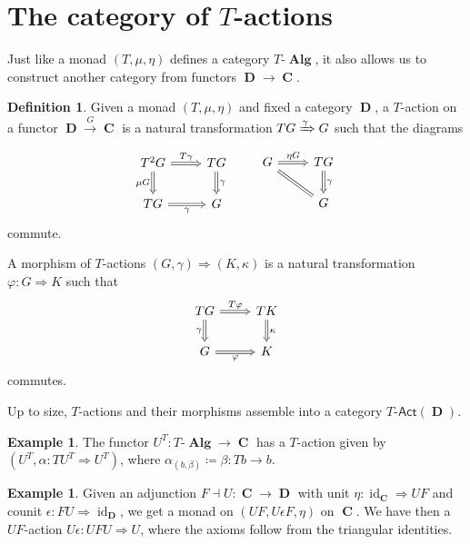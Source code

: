 \documentclass[a4paper,11pt,twoside, openany]{book}
\DeclareMathOperator{\Alg}{\mathbf{Alg}}
\DeclareMathOperator{\C}{\mathbf{C}}
\DeclareMathOperator{\D}{\mathbf{D}}
\DeclareMathOperator{\id}{id}
\theoremstyle{definition}
\theoremstyle{definition}
\newtheorem{defn}[thm]{Definition} %
\newtheorem{exmp}[thm]{Example} %
\theoremstyle{remark}
\begin{document}
\section{The category of $T$-actions}

Just like a monad $(T,\mu,\eta)$ defines a category $T\mbox{-}\Alg$, it also allows us to construct another category from functors $\D\rightarrow\C$.

\begin{defn}
	Given a monad $(T,\mu,\eta)$ and fixed a category $\D$, a $T$-action on a functor $\D\xrightarrow{G}\C$ is a natural transformation $TG\xRightarrow{\gamma}G$ such that the diagrams
	\[
		\begin{tikzcd}
			T^2G\ar["\mu G"', Rightarrow]{d}\ar["T\gamma", 	Rightarrow]{r}
			& TG\ar["\gamma", Rightarrow]{d} \\
			TG\ar["\gamma"', Rightarrow]{r}
			& G
		\end{tikzcd}
		\quad\quad
		\begin{tikzcd}
			G\ar["\eta G", Rightarrow]{r}\ar[equal]{dr}
			& TG\ar["\gamma", Rightarrow]{d}\\
			& G
		\end{tikzcd}
	\]
		commute.
	
		A morphism of $T$-actions $(G,\gamma)\Rightarrow (K,\kappa)$ is a natural transformation $\varphi\colon G\Rightarrow K$ such that
\[
\begin{tikzcd}
	TG\ar["T\varphi", Rightarrow]{r}\ar["\gamma"', Rightarrow]{d}
		& TK\ar["\kappa", Rightarrow]{d}\\
		G\ar[r, Rightarrow, "\varphi"']& K 
		\end{tikzcd}
		\]
		commutes.
	\end{defn}

	Up to size, $T$-actions and their morphisms assemble into a category $T\mbox{-}\mathsf{Act}(\D)$.

\begin{exmp}
	The functor $U^T\colon T\mbox{-}\Alg\rightarrow\C$ has a $T$-action given by $(U^T,\alpha\colon TU^T\Rightarrow U^T)$, where $\alpha_{(b,\beta)}\coloneqq\beta\colon Tb\rightarrow b$.
\end{exmp}

\begin{exmp}
	Given an adjunction  $F\dashv U\colon\C\rightarrow\D$ with unit $\eta\colon\id_{\C}\Rightarrow UF$ and counit $\epsilon\colon FU\Rightarrow\id_{\D}$, we get a monad on $(UF,U\epsilon F,\eta)$ on $\C$. We have then a $UF$-action $U\epsilon\colon UFU\Rightarrow U$, where the axioms follow from the triangular identities.
\end{exmp}
\end{document}
